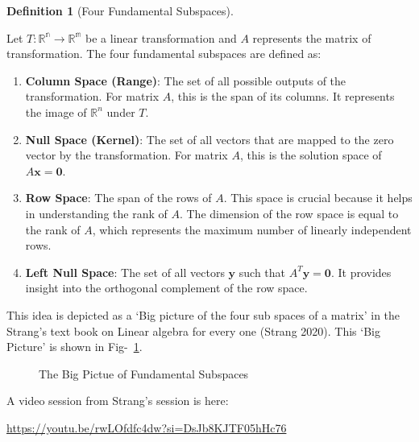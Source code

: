 \documentclass[
  letterpaper,
  DIV=11,
  numbers=noendperiod]{scrreprt}
\theoremstyle{plain}
\theoremstyle{definition}
\newtheorem{definition}{Definition}[chapter]
\theoremstyle{remark}
\begin{document}
\begin{definition}[Four Fundamental
Subspaces]\protect\hypertarget{def-FFS}{}\label{def-FFS}

Let \(T:\mathbb{R^n}\longrightarrow \mathbb{R^m}\) be a linear
transformation and \(A\) represents the matrix of transformation. The
four fundamental subspaces are defined as:

\begin{enumerate}
\def\labelenumi{\arabic{enumi}.}
\item
  \textbf{Column Space (Range)}: The set of all possible outputs of the
  transformation. For matrix \(A\), this is the span of its columns. It
  represents the image of \(\mathbb{R}^n\) under \(T\).
\item
  \textbf{Null Space (Kernel)}: The set of all vectors that are mapped
  to the zero vector by the transformation. For matrix \(A\), this is
  the solution space of \(A \mathbf{x} = \mathbf{0}\).
\item
  \textbf{Row Space}: The span of the rows of \(A\). This space is
  crucial because it helps in understanding the rank of \(A\). The
  dimension of the row space is equal to the rank of \(A\), which
  represents the maximum number of linearly independent rows.
\item
  \textbf{Left Null Space}: The set of all vectors \(\mathbf{y}\) such
  that \(A^T \mathbf{y} = \mathbf{0}\). It provides insight into the
  orthogonal complement of the row space.
\end{enumerate}

\end{definition}

This idea is depicted as a `Big picture of the four sub spaces of a
matrix' in the Strang's text book on Linear algebra for every one
(Strang 2020). This `Big Picture' is shown in Fig-~\ref{fig-big-pic}.

\begin{figure}


\caption{\label{fig-big-pic}The Big Pictue of Fundamental Subspaces}

\end{figure}%

A video session from Strang's session is here:

\url{https://youtu.be/rwLOfdfc4dw?si=DsJb8KJTF05hHc76}
\end{document}
